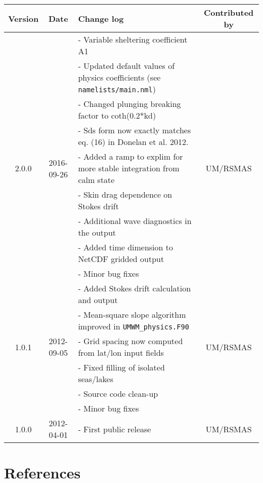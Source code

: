 \documentclass[letterpaper]{article}
\numberwithin{equation}{section}
\begin{document}
\begin{tabular}{|c||c|p{8cm}|c|}
\hline
Version & Date & Change log & Contributed by \\
\hline 
\hline

      &            & - Variable sheltering coefficient A1                              & \\
      &            & - Updated default values of physics coefficients (see \verb+namelists/main.nml+) & \\
      &            & - Changed plunging breaking factor to coth(0.2*kd)                & \\
      &            & - Sds form now exactly matches eq. (16) in Donelan et al. 2012.   & \\
2.0.0 & 2016-09-26 & - Added a ramp to explim for more stable integration from calm state & UM/RSMAS \\
      &            & - Skin drag dependence on Stokes drift                            & \\
      &            & - Additional wave diagnostics in the output                       & \\
      &            & - Added time dimension to NetCDF gridded output                   & \\
      &            & - Minor bug fixes                                                 & \\
\hline
      &            & - Added Stokes drift calculation and output                       & \\
      &            & - Mean-square slope algorithm improved in \verb+UMWM_physics.F90+ & \\
1.0.1 & 2012-09-05 & - Grid spacing now computed from lat/lon input fields             & UM/RSMAS \\
      &            & - Fixed filling of isolated seas/lakes                            & \\
      &            & - Source code clean-up                                            & \\
      &            & - Minor bug fixes                                                 & \\
\hline
1.0.0 & 2012-04-01 & - First public release & UM/RSMAS \\
\hline
\end{tabular}

\newpage
\section{References}
\end{document}
